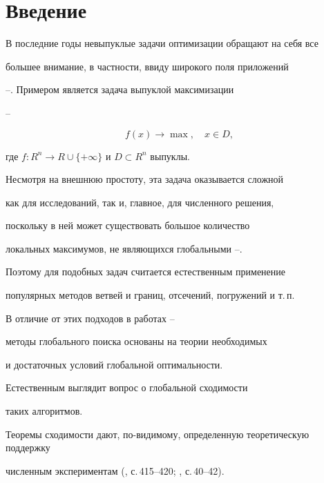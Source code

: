 \label{begin}








\section{Введение}





В последние годы невыпуклые задачи оптимизации обращают на себя все


большее внимание, в частности, ввиду широкого поля приложений 


\cite{l1}--\cite{l5}. Примером является задача выпуклой максимизации 


\cite{l3}--\cite{l7}


\begin{equation}


f(x)\rightarrow \max,\quad x\in D,


\label{eq:m1} 


\end{equation}


где $f:R^{n}\rightarrow R\cup \{+\infty \}$ и $D\subset R^{n}$ выпуклы.


Несмотря на внешнюю простоту, эта задача оказывается сложной


как для исследований, так и, главное, для численного решения, 


поскольку в ней может существовать большое количество


локальных максимумов, не являющихся глобальными \cite{l1}--\cite{l7}.


Поэтому для подобных задач считается естественным применение 


популярных методов ветвей и границ, отсечений, погружений и т.\,п.


В отличие от этих подходов в работах \cite{l6}--\cite{l10}


методы глобального поиска основаны на теории необходимых 


и достаточных условий глобальной оптимальности. 





Естественным выглядит вопрос о глобальной сходимости 


таких алгоритмов. 


Теоремы сходимости дают, по-видимому, определенную теоретическую поддержку 


численным экспериментам (\cite{l1}, с.\,415--420; \cite{l2}, с.\,40--42).


